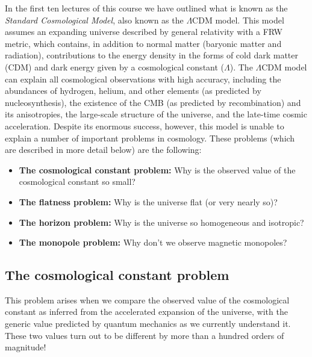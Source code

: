 \documentclass[11pt, a4paper,oneside,openright]{book}
\numberwithin{equation}{section}
\begin{document}
In the first ten lectures of this course we have outlined what is known as the {\it Standard Cosmological Model}, also known as the $\Lambda$CDM model. This model assumes an expanding universe described by general relativity with a FRW metric, which contains, in addition to normal matter (baryonic matter and radiation), contributions to the energy density in the forms of cold dark matter (CDM) and dark energy given by a cosmological constant ($\Lambda$). The $\Lambda$CDM model can explain all cosmological observations with high accuracy, including the abundances of hydrogen, helium, and other elements (as predicted by nucleosynthesis), the existence of the CMB (as predicted by recombination) and its anisotropies, the large-scale structure of the universe, and the late-time cosmic acceleration. Despite its enormous success, however, this model is unable to explain a number of important problems in cosmology. These problems (which are described in more detail below) are the following:
\begin{itemize}
\item {\bf The cosmological constant problem:} Why is the observed value of the cosmological constant so small?
\item {\bf The flatness problem:} Why is the universe flat (or very nearly so)?
\item {\bf The horizon problem:} Why is the universe so homogeneous and isotropic?
\item {\bf The monopole problem:} Why don't we observe magnetic monopoles?
\end{itemize}

\subsection{The cosmological constant problem}

This problem arises when we compare the observed value of the cosmological constant as inferred from the accelerated expansion of the universe, with the generic value predicted by quantum mechanics as we currently understand it. These two values turn out to be different by more than a hundred orders of magnitude!
\end{document}
